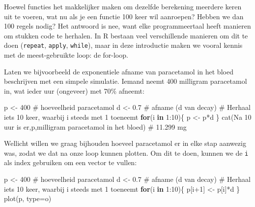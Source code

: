 \documentclass[
  b5paper,
  DIV=11,
  numbers=noendperiod]{scrreprt}
\newenvironment{Shaded}{\begin{snugshade}}{\end{snugshade}}
\newcommand{\AttributeTok}[1]{\textcolor[rgb]{0.40,0.45,0.13}{#1}}
\newcommand{\CommentTok}[1]{\textcolor[rgb]{0.37,0.37,0.37}{#1}}
\newcommand{\ControlFlowTok}[1]{\textcolor[rgb]{0.00,0.23,0.31}{\textbf{#1}}}
\newcommand{\DecValTok}[1]{\textcolor[rgb]{0.68,0.00,0.00}{#1}}
\newcommand{\FloatTok}[1]{\textcolor[rgb]{0.68,0.00,0.00}{#1}}
\newcommand{\FunctionTok}[1]{\textcolor[rgb]{0.28,0.35,0.67}{#1}}
\newcommand{\NormalTok}[1]{\textcolor[rgb]{0.00,0.23,0.31}{#1}}
\newcommand{\OtherTok}[1]{\textcolor[rgb]{0.00,0.23,0.31}{#1}}
\newcommand{\SpecialCharTok}[1]{\textcolor[rgb]{0.37,0.37,0.37}{#1}}
\newcommand{\StringTok}[1]{\textcolor[rgb]{0.13,0.47,0.30}{#1}}
\theoremstyle{definition}
\theoremstyle{remark}
\begin{document}
Hoewel functies het makkelijker maken om dezelfde berekening meerdere
keren uit te voeren, wat nu als je een functie 100 keer wil aanroepen?
Hebben we dan 100 regels nodig? Het antwoord is nee, want elke
programmeertaal heeft manieren om stukken code te herhalen. In R bestaan
veel verschillende manieren om dit te doen (\texttt{repeat},
\texttt{apply}, \texttt{while}), maar in deze introductie maken we
vooral kennis met de meest-gebruikte loop: de for-loop.

Laten we bijvoorbeeld de exponentiele afname van paracetamol in het
bloed beschrijven met een simpele simulatie. Iemand neemt 400 milligram
paracetamol in, wat ieder uur (ongeveer) met 70\% afneemt:

\begin{Shaded}
\begin{Highlighting}[]
\NormalTok{p }\OtherTok{\textless{}{-}} \DecValTok{400} \CommentTok{\# hoeveelheid paracetamol}
\NormalTok{d }\OtherTok{\textless{}{-}} \FloatTok{0.7} \CommentTok{\# afname (d van decay)}
\CommentTok{\# Herhaal iets 10 keer, waarbij \textquotesingle{}i\textquotesingle{} steeds met 1 toeneemt}
\ControlFlowTok{for}\NormalTok{(i }\ControlFlowTok{in} \DecValTok{1}\SpecialCharTok{:}\DecValTok{10}\NormalTok{)\{}
\NormalTok{  p }\OtherTok{\textless{}{-}}\NormalTok{ p}\SpecialCharTok{*}\NormalTok{d}
\NormalTok{\}}
\FunctionTok{cat}\NormalTok{(}\StringTok{\textquotesingle{}Na 10 uur is er\textquotesingle{}}\NormalTok{,p,}\StringTok{\textquotesingle{}milligram paracetamol in het bloed\textquotesingle{}}\NormalTok{) }\CommentTok{\# 11.299 mg}
\end{Highlighting}
\end{Shaded}

Wellicht willen we graag bijhouden hoeveel paracetamol er in elke stap
aanwezig was, zodat we dat na onze loop kunnen plotten. Om dit te doen,
kunnen we de \texttt{i} als index gebruiken om een vector te vullen:

\begin{Shaded}
\begin{Highlighting}[]
\NormalTok{p }\OtherTok{\textless{}{-}} \DecValTok{400} \CommentTok{\# hoeveelheid paracetamol}
\NormalTok{d }\OtherTok{\textless{}{-}} \FloatTok{0.7} \CommentTok{\# afname (d van decay)}
\CommentTok{\# Herhaal iets 10 keer, waarbij \textquotesingle{}i\textquotesingle{} steeds met 1 toeneemt}
\ControlFlowTok{for}\NormalTok{(i }\ControlFlowTok{in} \DecValTok{1}\SpecialCharTok{:}\DecValTok{10}\NormalTok{)\{}
\NormalTok{  p[i}\SpecialCharTok{+}\DecValTok{1}\NormalTok{] }\OtherTok{\textless{}{-}}\NormalTok{ p[i]}\SpecialCharTok{*}\NormalTok{d}
\NormalTok{\}}
\FunctionTok{plot}\NormalTok{(p, }\AttributeTok{type=}\StringTok{\textquotesingle{}o\textquotesingle{}}\NormalTok{)}
\end{Highlighting}
\end{Shaded}
\end{document}
